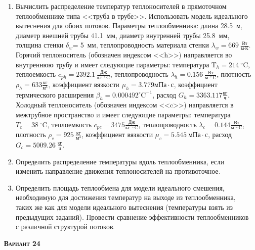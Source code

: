 \begin{enumerate} 
\item Вычислить распределение температур теплоносителей в прямоточном теплообменнике типа <<труба в трубе>>. Использовать модель идеального вытеснения для обоих потоков. Параметры теплообменника: длина  28.5~м, диаметр внешней трубы 41.1~мм,  диаметр внутренней трубы 25.8~мм, толщина стенки $\delta_{w}$=     5~мм,  теплопроводность материала стенки $\lambda_{w}=  669~\frac{\text{Вт}}{\text{м} \cdot \text{К}}$.  Горячий теплоноситель (обозначен индексом <<h>>) направляется во внутреннюю трубу и	 имеет следующие параметры: температура $\text{T}_{h}= 214~^\circ\mathrm{C}$, теплоемкость	  $c_{p{h}}= 2392.1~\frac{\text{Дж}}{\text{кг} \cdot ^\circ\mathrm{C}}$, теплопроводность 		$\lambda_{h}= 0.156~\frac{\text{Вт}}{\text{м} \cdot ^\circ\mathrm{C}}$, плотность 		$\rho_{h}=  633 \frac{\text{кг}}{\text{м}^3}$, коэффициент вязкости $\mu_{h}=3.779 \text{мПа} 		\cdot \text{с} $, коэффициент термического расширения $\beta_{h}=0.000492 ^\circ\mathrm{C}^{-1}$,		 расход $G_{h}= 3363.117 \frac{\text{кг}}{\text{ч}}$. Холодный теплоноситель (обозначен индексом <<c>>) 		 направляется в межтрубное пространство и имеет следующие параметры: температура $T_{c}=   38		 ~^\circ\mathrm{C}$, теплоемкость $c_{p{c}}= 3475 \frac{\text{Дж}}{\text{кг} \cdot ^\circ\mathrm{C}}$,			 теплопроводность $\lambda_{c}=0.144 \frac{\text{Вт}}{\text{м} \cdot ^\circ\mathrm{C}}$, плотность 			 $\rho_{c}=   925~\frac{\text{кг}}{\text{м}^3}$, коэффициент вязкости $\mu_{c}=5.545~\text{мПа} \cdot \text{с} $, 			 расход $G_{c}=5009.26~\frac{\text{кг}}{\text{ч}}$. 

\item Определить распределение температуры вдоль теплообменника, если 	изменить направление движения теплоносителей на противоточное.

\item Определить площадь теплообмена для модели идеального смешения, необходимую для достижения 	температур на выходе из теплообменника, таких же как для модели идеального вытеснения (температуры взять из предыдущих заданий).	Провести сравнение эффективности теплообменников с различной структурой потоков.

\end{enumerate}

\textsc{\textbf{Вариант 24}}

